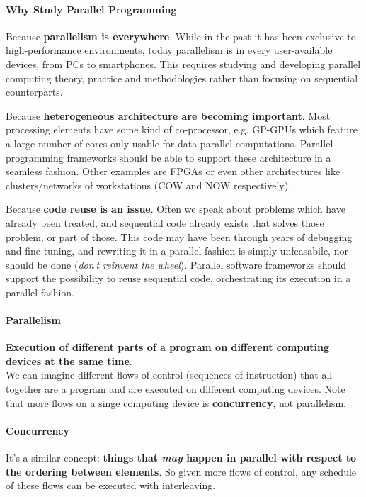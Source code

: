 \documentclass[10pt]{report}
\begin{document}
\paragraph{Why Study Parallel Programming}
\begin{list}{}{}
	\item Because \textbf{parallelism is everywhere}. While in the past it has been exclusive to high-performance environments, today parallelism is in every user-available devices, from PCs to smartphones. This requires studying and developing parallel computing theory, practice and methodologies rather than focusing on sequential counterparts.
	\item Because \textbf{heterogeneous architecture are becoming important}. Most processing elements have some kind of co-processor, e.g. GP-GPUs which feature a large number of cores only usable for data parallel computations. Parallel programming frameworks should be able to support these architecture in a seamless fashion. Other examples are FPGAs or even other architectures like clusters/networks of workstations (COW and NOW respectively).
	\item Because \textbf{code reuse is an issue}. Often we speak about problems which have already been treated, and sequential code already exists that solves those problem, or part of those. This code may have been through years of debugging and fine-tuning, and rewriting it in a parallel fashion is simply unfeasabile, nor should be done (\textit{don't reinvent the wheel}). Parallel software frameworks should support the possibility to reuse sequential code, orchestrating its execution in a parallel fashion.
\end{list}
\paragraph{Parallelism} \textbf{Execution of different parts of a program on different computing devices at the same time}.\\
We can imagine different flows of control (sequences of instruction) that all together are a program and are executed on different computing devices. Note that more flows on a singe computing device is \textbf{concurrency}, not parallelism.
\paragraph{Concurrency} It's a similar concept: \textbf{things that \textit{may} happen in parallel with respect to the ordering between elements}. So given more flows of control, any schedule of these flows can be executed with interleaving.
\end{document}

